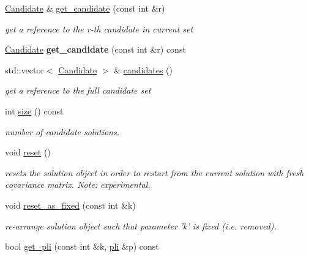 \begin{DoxyCompactItemize}
\hyperlink{classlibcmaes_1_1Candidate}{Candidate} \& \hyperlink{classlibcmaes_1_1CMASolutions_afd3a88bc8d118c0b72f916025ca9c65b}{get\+\_\+candidate} (const int \&r)
\begin{DoxyCompactList}\small\item\em get a reference to the r-\/th candidate in current set \end{DoxyCompactList}\item 
\hypertarget{classlibcmaes_1_1CMASolutions_a6e09db59a9c89d1fe74648e3278d7b83}{\hyperlink{classlibcmaes_1_1Candidate}{Candidate} {\bfseries get\+\_\+candidate} (const int \&r) const }\label{classlibcmaes_1_1CMASolutions_a6e09db59a9c89d1fe74648e3278d7b83}

\item 
\hypertarget{classlibcmaes_1_1CMASolutions_a47b162f936193f0f80322503a469a6aa}{std\+::vector$<$ \hyperlink{classlibcmaes_1_1Candidate}{Candidate} $>$ \& \hyperlink{classlibcmaes_1_1CMASolutions_a47b162f936193f0f80322503a469a6aa}{candidates} ()}\label{classlibcmaes_1_1CMASolutions_a47b162f936193f0f80322503a469a6aa}

\begin{DoxyCompactList}\small\item\em get a reference to the full candidate set \end{DoxyCompactList}\item 
int \hyperlink{classlibcmaes_1_1CMASolutions_a7a7e71c54967613717d2928a38715429}{size} () const 
\begin{DoxyCompactList}\small\item\em number of candidate solutions. \end{DoxyCompactList}\item 
\hypertarget{classlibcmaes_1_1CMASolutions_ab825c9198ee6f7bd9a9b244e567c8624}{void \hyperlink{classlibcmaes_1_1CMASolutions_ab825c9198ee6f7bd9a9b244e567c8624}{reset} ()}\label{classlibcmaes_1_1CMASolutions_ab825c9198ee6f7bd9a9b244e567c8624}

\begin{DoxyCompactList}\small\item\em resets the solution object in order to restart from the current solution with fresh covariance matrix. Note\+: experimental. \end{DoxyCompactList}\item 
void \hyperlink{classlibcmaes_1_1CMASolutions_a036e5542869da8d603388543f8cc9f86}{reset\+\_\+as\+\_\+fixed} (const int \&k)
\begin{DoxyCompactList}\small\item\em re-\/arrange solution object such that parameter 'k' is fixed (i.\+e. removed). \end{DoxyCompactList}\item 
\hypertarget{classlibcmaes_1_1CMASolutions_abdd25e16cb0745e33652d0b3f09a77d1}{bool \hyperlink{classlibcmaes_1_1CMASolutions_abdd25e16cb0745e33652d0b3f09a77d1}{get\+\_\+pli} (const int \&k, \hyperlink{classlibcmaes_1_1pli}{pli} \&p) const }\label{classlibcmaes_1_1CMASolutions_abdd25e16cb0745e33652d0b3f09a77d1}


\end{DoxyCompactItemize}
